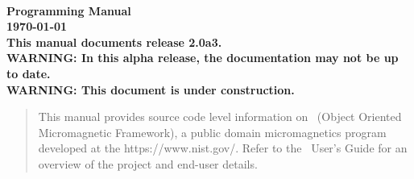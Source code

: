 
\usepackage{l2hbugs}




\nocite{*}  %


\begin{titlepage}
\label{page:contents}
\par
\vspace*{\fill}
\begin{center}
\Large\bf
\OOMMF\\
Programming Manual\\[2ex]
\large
{\today}
{}\\[2ex]
This manual documents release 2.0a3.\\[1ex]
WARNING: In this alpha release, the
documentation may not be up to date.\\[1ex]
WARNING: This document is under construction.

\end{center}
\vspace{10\baselineskip}
\begin{abstract}
This manual provides source code level information on \OOMMF\ (Object Oriented Micromagnetic Framework),
a public domain micromagnetics program developed at the
{https://www.nist.gov/}.  Refer to the \OOMMF\ User's Guide for an
overview of the project and end-user details.
\end{abstract}
\vspace*{\fill}
\par
\end{titlepage}

\begin{latexonly}
\tableofcontents
\end{latexonly}


\newpage

\newpage







%
%






\printindex



